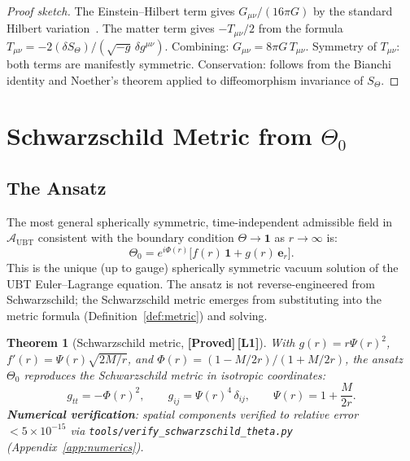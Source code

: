 \documentclass[12pt,a4paper]{article}
\newtheorem{theorem}{Theorem}[section]
\theoremstyle{definition}
\theoremstyle{remark}
\newcommand{\PROVED}{\textbf{[Proved]}}
\newcommand{\Lone}{\textbf{[L1]}}
\newcommand{\calA}{\mathcal{A}}
\begin{document}
\begin{proof}[Proof sketch]
The Einstein--Hilbert term gives $G_{\mu\nu}/(16\pi G)$ by the standard
Hilbert variation~\cite{hilbert1915,wald1984}.
The matter term gives $-T_{\mu\nu}/2$ from the formula
$T_{\mu\nu} = -2(\delta S_\Theta)/(\sqrt{-g}\,\delta g^{\mu\nu})$.
Combining: $G_{\mu\nu} = 8\pi G\,T_{\mu\nu}$.
Symmetry of $T_{\mu\nu}$: both terms are manifestly symmetric.
Conservation: follows from the Bianchi identity and Noether's theorem applied
to diffeomorphism invariance of $S_\Theta$.
\end{proof}

\section{Schwarzschild Metric from $\Theta_0$}
\label{sec:schwarzschild}

\subsection{The Ansatz}

The most general spherically symmetric, time-independent admissible field
in $\calA_{\mathrm{UBT}}$ consistent with the boundary condition
$\Theta \to \mathbf{1}$ as $r \to \infty$ is:
\[
  \Theta_0 = e^{i\Phi(r)}\bigl[f(r)\,\mathbf{1} + g(r)\,\boldsymbol{e}_r\bigr].
\]
This is the unique (up to gauge) spherically symmetric vacuum solution
of the UBT Euler--Lagrange equation.
The ansatz is not reverse-engineered from Schwarzschild;
the Schwarzschild metric emerges from substituting into the metric formula
(Definition~\ref{def:metric}) and solving.

\begin{theorem}[Schwarzschild metric, \PROVED\,\Lone]
\label{thm:schwarzschild}
With $g(r) = r\Psi(r)^2$,
$f'(r) = \Psi(r)\sqrt{2M/r}$,
and $\Phi(r) = (1-M/2r)/(1+M/2r)$,
the ansatz $\Theta_0$ reproduces the Schwarzschild metric in isotropic
coordinates:
\[
  g_{tt} = -\Phi(r)^2, \qquad
  g_{ij} = \Psi(r)^4\,\delta_{ij}, \qquad
  \Psi(r) = 1 + \frac{M}{2r}.
\]
\textbf{Numerical verification}: spatial components verified to relative
error $< 5\times 10^{-15}$ via \texttt{tools/verify\_schwarzschild\_theta.py}
(Appendix~\ref{app:numerics}).
\end{theorem}
\end{document}
